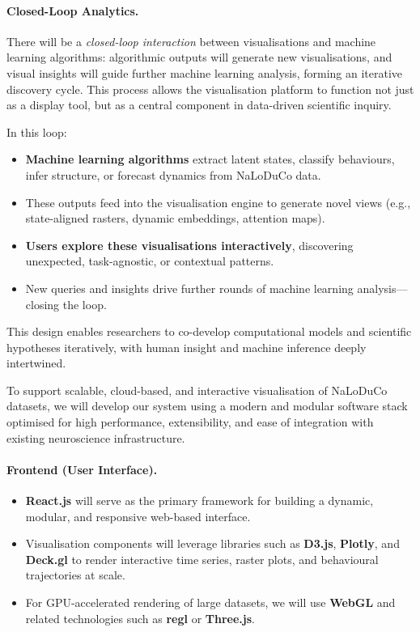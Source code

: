 \paragraph{Closed-Loop Analytics.}
There will be a \emph{closed-loop interaction} between visualisations and machine learning algorithms: algorithmic outputs will generate new visualisations, and visual insights will guide further machine learning analysis, forming an iterative discovery cycle. This process allows the visualisation platform to function not just as a display tool, but as a central component in data-driven scientific inquiry.

In this loop:
\begin{itemize}
  \item \textbf{Machine learning algorithms} extract latent states, classify behaviours, infer structure, or forecast dynamics from NaLoDuCo data.
  \item These outputs feed into the visualisation engine to generate novel views (e.g., state-aligned rasters, dynamic embeddings, attention maps).
  \item \textbf{Users explore these visualisations interactively}, discovering unexpected, task-agnostic, or contextual patterns.
  \item New queries and insights drive further rounds of machine learning analysis—closing the loop.
\end{itemize}

This design enables researchers to co-develop computational models and scientific hypotheses iteratively, with human insight and machine inference deeply intertwined.

\label{sec:visSoftwareStack}

To support scalable, cloud-based, and interactive visualisation of NaLoDuCo
datasets, we will develop our system using a modern and modular software stack
optimised for high performance, extensibility, and ease of integration with
existing neuroscience infrastructure.

\paragraph{Frontend (User Interface).}
\begin{itemize}
          \item \textbf{React.js} will serve as the primary framework for
              building a dynamic, modular, and responsive web-based interface.
                \item Visualisation components will leverage libraries such as
                    \textbf{D3.js}, \textbf{Plotly}, and \textbf{Deck.gl} to
                    render interactive time series, raster plots, and
                    behavioural trajectories at scale.
                      \item For GPU-accelerated rendering of large datasets, we
                          will use \textbf{WebGL} and related technologies such
                          as \textbf{regl} or \textbf{Three.js}.
\end{itemize}

